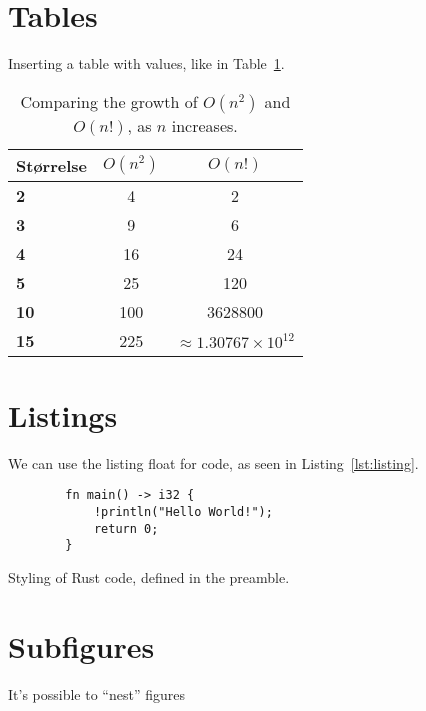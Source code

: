 \documentclass[../../main.tex]{subfiles}
\begin{document}
\section{Tables}
Inserting a table with values, like in Table~\ref{tab:table}.

\begin{table}[htb!]
    \centering
    \begin{tabular}{>{\bfseries}lcc}
        \toprule
        Størrelse   & $O(n^2)$  & $O(n!)$ \\
        \midrule
        2           & 4         & 2 \\
        3           & 9         & 6 \\
        4           & 16        & 24 \\
        5           & 25        & 120 \\
        10          & 100       & 3628800 \\
        15          & 225       & $\approx 1.30767 \times 10^{12}$ \\
        \bottomrule
    \end{tabular}
    \caption{Comparing the growth of $O(n^2)$ and $O(n!)$, as $n$ increases.}
    \label{tab:table}
\end{table}


\section{Listings}
We can use the listing float for code, as seen in Listing~\ref{lst:listing}.

\begin{listing}[htb!]
    \begin{verbatim}
        fn main() -> i32 {
            !println("Hello World!");
            return 0;
        }
    \end{verbatim}
    \caption{Styling of Rust code, defined in the preamble.}
    \label{lst:listing}
\end{listing}

\clearpage

\section{Subfigures}
It's possible to ``nest'' figures
\end{document}
